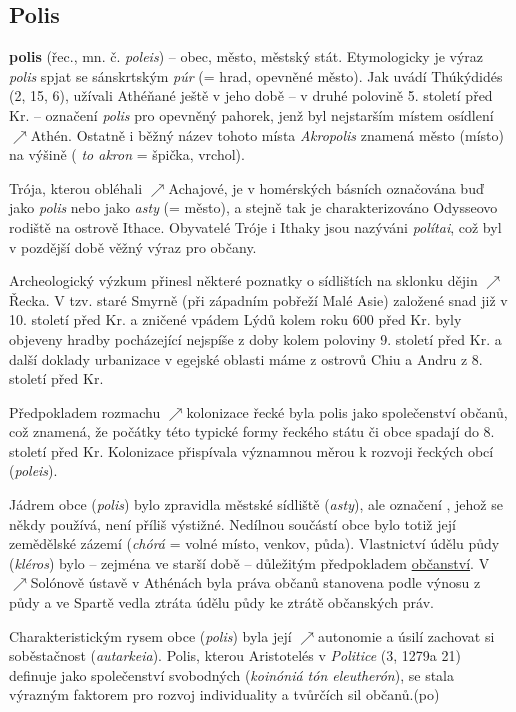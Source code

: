 \documentclass{article}
\begin{document}
  \subsection*{Polis~\cite{Oliva:}}
  \label{sec:polis}

  {\bf polis} (řec., mn. č. {\it poleis}) -- obec, město, městský stát. Etymologicky je výraz  {\it polis} spjat se sánskrtským  {\it púr} (= hrad, opevněné město). Jak uvádí Thúkýdidés (2, 15, 6), užívali Athéňané ještě v jeho době -- v druhé polovině 5. století před Kr. -- označení  {\it polis} pro opevněný pahorek, jenž byl nejstarším místem osídlení $\nearrow$Athén. Ostatně i běžný název tohoto místa  {\it Akropolis} znamená město (místo) na výšině ( {\it to akron} = špička, vrchol).

  Trója, kterou obléhali $\nearrow$Achajové, je v homérských básních označována buď jako  {\it polis} nebo jako  {\it asty} (= město), a stejně tak je charakterizováno Odysseovo rodiště na ostrově Ithace. Obyvatelé Tróje i Ithaky jsou nazýváni  {\it polítai}, což byl v pozdější době věžný výraz pro občany.

  Archeologický výzkum přinesl některé poznatky o sídlištích na sklonku  dějin $\nearrow$Řecka. V tzv. staré Smyrně (při západním pobřeží Malé Asie) založené snad již v 10. století před Kr. a zničené vpádem Lýdů kolem roku 600 před Kr. byly objeveny hradby pocházející nejspíše z doby kolem poloviny 9. století před Kr. a další doklady urbanizace v egejské oblasti máme z ostrovů Chiu a Andru z 8. století před Kr.

  Předpokladem rozmachu $\nearrow$kolonizace řecké byla polis jako společenství občanů, což znamená, že počátky této typické formy řeckého státu či obce spadají do 8. století před Kr. Kolonizace přispívala významnou měrou k rozvoji řeckých obcí ({\it poleis}).

  Jádrem obce ({\it polis}) bylo zpravidla městské sídliště ({\it asty}), ale označení , jehož se někdy používá, není příliš výstižné. Nedílnou součástí obce bylo totiž její zemědělské zázemí ({\it chórá} = volné místo, venkov, půda). Vlastnictví údělu půdy ({\it kléros}) bylo -- zejména ve starší době -- důležitým předpokladem \hyperref[sec:obcanstvi]{občanství}. V $\nearrow$Solónově ústavě v Athénách byla práva občanů stanovena podle výnosu z půdy a ve Spartě vedla ztráta údělu půdy ke ztrátě občanských práv.

  Charakteristickým rysem obce ({\it polis}) byla její $\nearrow$autonomie a úsilí zachovat si soběstačnost ({\it autarkeia}). Polis, kterou Aristotelés v {\it Politice} (3, 1279a 21) definuje jako společenství svobodných ({\it koinóniá tón eleutherón}), se stala výrazným faktorem pro rozvoj individuality a tvůrčích sil občanů.\hfill (po)
\end{document}
